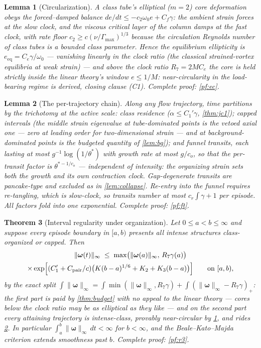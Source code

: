\documentclass[11pt,letterpaper]{amsart}
\newtheorem{theorem}{Theorem}[section]
\newtheorem{lemma}[theorem]{Lemma}
\theoremstyle{definition}
\theoremstyle{remark}
\newcommand{\om}{\omega}
\newcommand{\vort}{\boldsymbol{\omega}}
\newcommand{\norm}[1]{\lVert #1 \rVert}
\begin{document}
\begin{lemma}[Circularization]\label{lem:ec}
A class tube's elliptical ($m=2$) core deformation obeys the forced--damped balance
$de/dt\le-c_2\om_0e+C_f\gamma$: the ambient strain forces at the slow clock, and the
viscous critical layer of the column damps at the fast clock, with rate floor
$c_2\ge c(\nu/\Gamma_{\max})^{1/3}$ because the circulation Reynolds number of class
tubes is a bounded class parameter. Hence the equilibrium ellipticity is
$e_{\mathrm{eq}}=C_e\gamma/\om_0$ --- vanishing linearly in the clock ratio (the
classical strained-vortex equilibria \cite{MooreSaffman1971,Kida1981} at weak strain)
--- and above the clock ratio $R_7=2MC_e$ the core is held strictly inside the linear
theory's window $e\le1/M$: near-circularity in the load-bearing regime is
\emph{derived}, closing clause \textup{(C1)}. Complete proof: \cref{pf:ec}.
\end{lemma}

\begin{lemma}[The per-trajectory chain]\label{lem:ft}
Along any flow trajectory, time partitions by the trichotomy at the active scale:
class residence ($\alpha\le C_1'\gamma$, \cref{thm:jc1}); capped intervals (the
middle strain eigenvalue at tube-dominated points is the vetoed axial one --- zero at
leading order for two-dimensional strain --- and at background-dominated points is the
budgeted quantity of \cref{lem:bg}); and funnel transits, each lasting at most
$g^{-1}\log(1/\theta^*)$ with growth rate at most $g/c_o$, so that the per-transit
factor is $\theta^{*-1/c_o}$ --- \emph{independent of intensity}: the organizing
strain sets both the growth and its own contraction clock. Gap-degenerate transits
are pancake-type and excluded as in \cref{lem:collapse}. Re-entry into the funnel
requires re-tangling, which is slow-clock, so transits number at most
$c_r\int\gamma+1$ per episode. All factors fold into one exponential. Complete
proof: \cref{pf:ft}.
\end{lemma}

\begin{theorem}[Interval regularity under organization]\label{thm:r3}
Let $0\le a<b\le\infty$ and suppose every episode boundary in $[a,b)$ presents all
intense structures class-organized or capped. Then
\begin{multline*}
\norm{\vort(t)}_\infty\;\le\;\max\bigl(\norm{\vort(a)}_\infty,\,R_7\gamma(a)\bigr)\\
\times\exp\Bigl[(C_1'+C_{\mathrm{pair}}/c)\bigl(K(b-a)^{1/6}+K_2+K_3(b-a)\bigr)\Bigr]
\qquad\text{on }[a,b),
\end{multline*}
by the exact split
$\int\norm{\vort}_\infty
=\int\min(\norm{\vort}_\infty,R_7\gamma)+\int(\norm{\vort}_\infty-R_7\gamma)_+$: the
first part is paid by \cref{thm:budget} with no appeal to the linear theory --- cores
below the clock ratio may be as elliptical as they like --- and on the second part
every attaining trajectory is intense-class, provably near-circular by \cref{lem:ec},
and rides \cref{lem:ft}. In particular $\int_a^b\norm{\vort}_\infty\,dt<\infty$ for
$b<\infty$, and the Beale--Kato--Majda criterion \cite{BealeKatoMajda1984} extends
smoothness past $b$. Complete proof: \cref{pf:r3}.
\end{theorem}
\end{document}
